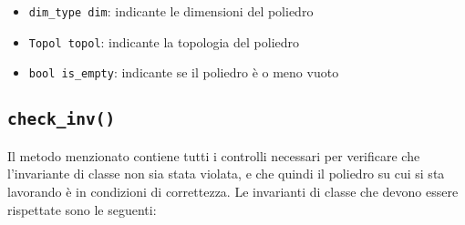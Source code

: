 \documentclass{mimosis}
\theoremstyle{definition}
\begin{document}
\begin{itemize}
\item \texttt{dim\_type dim}: indicante le dimensioni del poliedro
\item \texttt{Topol topol}: indicante la topologia del poliedro
\item \texttt{bool is\_empty}: indicante se il poliedro è o meno vuoto
\end{itemize}

\subsection{\texttt{check\_inv()}}
\label{sec:org452eef3}
Il metodo menzionato contiene tutti i controlli necessari per verificare che
l'invariante di classe non sia stata violata, e che quindi il poliedro su cui si
sta lavorando è in condizioni di correttezza. Le invarianti di classe che devono
essere rispettate sono le seguenti:
\end{document}
